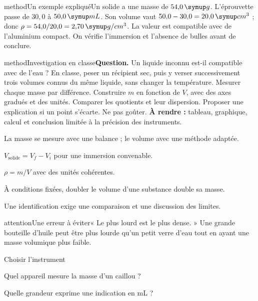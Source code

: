 \begin{pcEncadre}{method}{Un exemple expliqué}Un solide a une masse de $54{,}0\unite g$. L’éprouvette passe de $30{,}0$ à $50{,}0\unite{mL}$. Son volume vaut $50{,}0-30{,}0=20{,}0\unite{cm^3}$ ; donc $\rho=54{,}0/20{,}0=2{,}70\unite{g/cm^3}$. La valeur est compatible avec de l’aluminium compact. On vérifie l’immersion et l’absence de bulles avant de conclure.\end{pcEncadre}
\label{activite-1}
\begin{pcEncadre}{method}{Investigation en classe}\textbf{Question.} Un liquide inconnu est-il compatible avec de l’eau ? En classe, peser un récipient sec, puis y verser successivement trois volumes connus du même liquide, sans changer la température. Mesurer chaque masse par différence. Construire $m$ en fonction de $V$, avec des axes gradués et des unités. Comparer les quotients et leur dispersion. Proposer une explication si un point s’écarte. Ne pas goûter. \textbf{À rendre :} tableau, graphique, calcul et conclusion limitée à la précision des instruments.\end{pcEncadre}
\begin{questions}
\item La masse se mesure avec une balance ; le volume avec une méthode adaptée.
\item $V_{\text{solide}}=V_f-V_i$ pour une immersion convenable.
\item $\rho=m/V$ avec des unités cohérentes.
\item À conditions fixées, doubler le volume d’une substance double sa masse.
\item Une identification exige une comparaison et une discussion des limites.
\end{questions}
\begin{pcEncadre}{attention}{Une erreur à éviter}« Le plus lourd est le plus dense. » Une grande bouteille d’huile peut être plus lourde qu’un petit verre d’eau tout en ayant une masse volumique plus faible.\end{pcEncadre}
\pcGrille
\clearpage{}
\par\noindent\begin{minipage}{\linewidth}
\begin{exercice}[1]{Choisir l’instrument}
\begin{questions}
\item Quel appareil mesure la masse d’un caillou ?
\item Quelle grandeur exprime une indication en mL ?
\end{questions}
\end{exercice}
\end{minipage}
